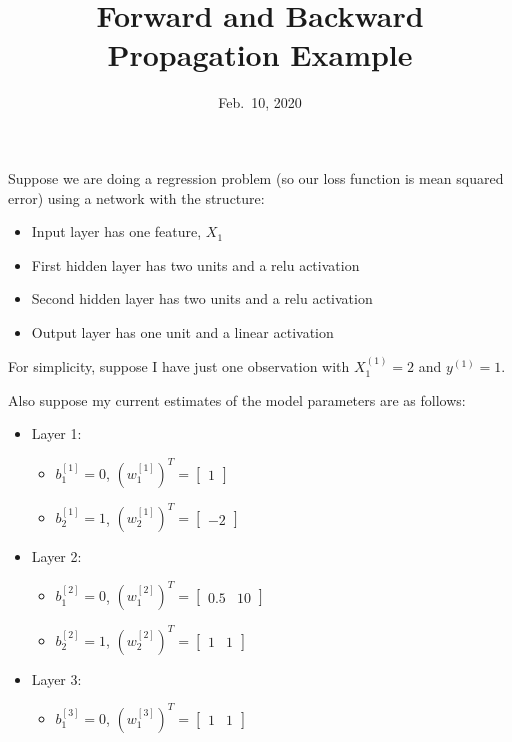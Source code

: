 \documentclass[]{extarticle}
\title{Forward and Backward Propagation Example}
\subtitle{Feb.~10, 2020}
\author{}
\date{}
\providecommand{\tightlist}{%
  \setlength{\itemsep}{0pt}\setlength{\parskip}{0pt}}
\begin{document}
\maketitle

Suppose we are doing a regression problem (so our loss function is mean
squared error) using a network with the structure:

\begin{itemize}
\tightlist
\item
  Input layer has one feature, \(X_1\)
\item
  First hidden layer has two units and a relu activation
\item
  Second hidden layer has two units and a relu activation
\item
  Output layer has one unit and a linear activation
\end{itemize}

For simplicity, suppose I have just one observation with
\(X^{(1)}_1 = 2\) and \(y^{(1)} = 1\).

Also suppose my current estimates of the model parameters are as
follows:

\begin{itemize}
\tightlist
\item
  Layer 1:

  \begin{itemize}
  \tightlist
  \item
    \(b^{[1]}_1 = 0\),
    \(\left(w^{[1]}_1\right)^T = \begin{bmatrix}1\end{bmatrix}\)
  \item
    \(b^{[1]}_2 = 1\),
    \(\left(w^{[1]}_2\right)^T = \begin{bmatrix}-2\end{bmatrix}\)
  \end{itemize}
\item
  Layer 2:

  \begin{itemize}
  \tightlist
  \item
    \(b^{[2]}_1 = 0\),
    \(\left(w^{[2]}_1\right)^T = \begin{bmatrix}0.5 & 10 \end{bmatrix}\)
  \item
    \(b^{[2]}_2 = 1\),
    \(\left(w^{[2]}_2\right)^T = \begin{bmatrix}1 & 1 \end{bmatrix}\)
  \end{itemize}
\item
  Layer 3:

  \begin{itemize}
  \tightlist
  \item
    \(b^{[3]}_1 = 0\),
    \(\left(w^{[3]}_1\right)^T = \begin{bmatrix}1 & 1 \end{bmatrix}\)
  \end{itemize}
\end{itemize}
\end{document}
